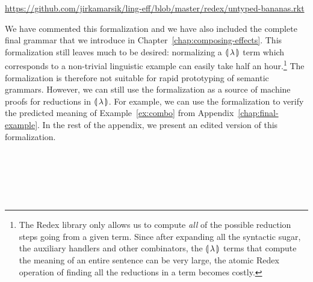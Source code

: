 \centerline{\url{https://github.com/jirkamarsik/ling-eff/blob/master/redex/untyped-bananas.rkt}}

We have commented this formalization and we have also included the complete
final grammar that we introduce in
Chapter~\ref{chap:composing-effects}. This formalization still leaves much
to be desired: normalizing a ${\llparenthesis \, \lambda \, \rrparenthesis}$ term which corresponds to a
non-trivial linguistic example can easily take half an hour.\footnote{The
  Redex library only allows us to compute \emph{all} of the possible
  reduction steps going from a given term. Since after expanding all the
  syntactic sugar, the auxiliary handlers and other combinators, the
  ${\llparenthesis \, \lambda \, \rrparenthesis}$ terms that compute the meaning of an entire sentence can be very
  large, the atomic Redex operation of finding all the reductions in a term
  becomes costly.} The formalization is therefore not suitable for rapid
prototyping of semantic grammars. However, we can still use the
formalization as a source of machine proofs for reductions in ${\llparenthesis \, \lambda \, \rrparenthesis}$. For
example, we can use the formalization to verify the predicted meaning of
Example~\ref{ex:combo} from Appendix~\ref{chap:final-example}. In the rest
of the appendix, we present an edited version of this formalization.
\newpage

\setmonofont{DejaVu Sans Mono}

\inputminted{racket}{redex/intro.rkt}
\newpage
\inputminted{racket}{redex/reduce.rkt}
\newpage
\inputminted{racket}{redex/anaphora.rkt}
\newpage
\inputminted{racket}{redex/code.rkt}
\newpage
\inputminted{racket}{redex/extend-ops.rkt}
\newpage
\inputminted{racket}{redex/handlers.rkt}
\newpage
\inputminted{racket}{redex/grammar.rkt}
